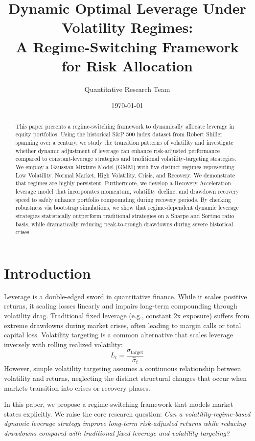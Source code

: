 \documentclass[11pt]{article}
\title{Dynamic Optimal Leverage Under Volatility Regimes:\\A Regime-Switching Framework for Risk Allocation}
\author{Quantitative Research Team}
\date{\today}
\begin{document}
\maketitle

\begin{abstract}
This paper presents a regime-switching framework to dynamically allocate leverage in equity portfolios. Using the historical S\&P 500 index dataset from Robert Shiller spanning over a century, we study the transition patterns of volatility and investigate whether dynamic adjustment of leverage can enhance risk-adjusted performance compared to constant-leverage strategies and traditional volatility-targeting strategies. We employ a Gaussian Mixture Model (GMM) with five distinct regimes representing Low Volatility, Normal Market, High Volatility, Crisis, and Recovery. We demonstrate that regimes are highly persistent. Furthermore, we develop a Recovery Acceleration leverage model that incorporates momentum, volatility decline, and drawdown recovery speed to safely enhance portfolio compounding during recovery periods. By checking robustness via bootstrap simulations, we show that regime-dependent dynamic leverage strategies statistically outperform traditional strategies on a Sharpe and Sortino ratio basis, while dramatically reducing peak-to-trough drawdowns during severe historical crises.
\end{abstract}

\section{Introduction}
Leverage is a double-edged sword in quantitative finance. While it scales positive returns, it scaling losses linearly and impairs long-term compounding through volatility drag. Traditional fixed leverage (e.g., constant 2x exposure) suffers from extreme drawdowns during market crises, often leading to margin calls or total capital loss. Volatility targeting is a common alternative that scales leverage inversely with rolling realized volatility:
\begin{equation}
L_t = \frac{\sigma_{\text{target}}}{\hat{\sigma}_t}
\end{equation}
However, simple volatility targeting assumes a continuous relationship between volatility and returns, neglecting the distinct structural changes that occur when markets transition into crises or recovery phases.

In this paper, we propose a regime-switching framework that models market states explicitly. We raise the core research question: \textit{Can a volatility-regime-based dynamic leverage strategy improve long-term risk-adjusted returns while reducing drawdowns compared with traditional fixed leverage and volatility targeting?}
\end{document}
